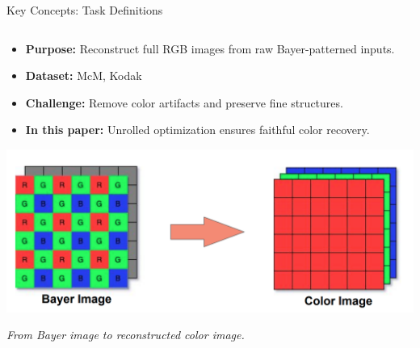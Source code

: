 \documentclass[aspectratio=169,xcolor=dvipsnames]{beamer}
\begin{document}
\begin{frame}{Key Concepts: Task Definitions}
\begin{columns}[c]
\begin{column}{0.50\textwidth}
\begin{itemize}
    \item \textbf{Purpose:} Reconstruct full RGB images from raw Bayer-patterned inputs.
    \item \textbf{Dataset:} McM, Kodak
    \item \textbf{Challenge:} Remove color artifacts and preserve fine structures.
    \item \textbf{In this paper:} Unrolled optimization ensures faithful color recovery.
\end{itemize}
\vspace{-0.2cm}
\begin{center}
    \includegraphics[width=0.7\linewidth]{Demosaicking.png}
    
    \tiny \textit{From Bayer image to reconstructed color image.}
\end{center}

\end{column}

\end{columns}

\end{frame}
\end{document}
